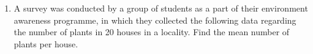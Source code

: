\renewcommand{\theequation}{\theenumi}
\begin{enumerate}[label=\arabic*.,ref=\thesubsection.\theenumi]
\item A survey was conducted by a group of students as a part of their environment awareness
programme, in which they collected the following data regarding the number of plants in
20 houses in a locality. Find the mean number of plants per house.\\

\end{enumerate}